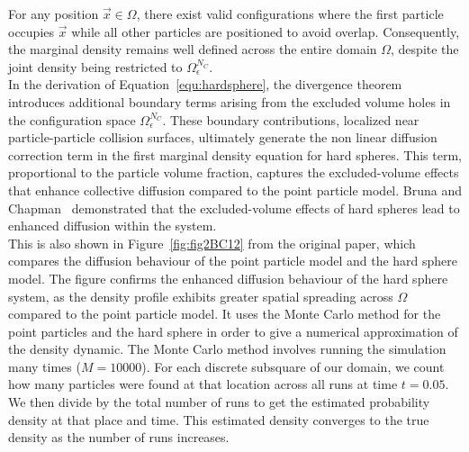 For any position $\vec{x} \in \Omega$, there exist valid configurations where the first particle occupies $\vec{x}$ while all other particles are positioned to avoid overlap. 
Consequently, the marginal density remains well defined across the entire domain $\Omega$, despite the joint density being restricted to $\Omega_{\epsilon}^{N_C}$. \\
In the derivation of Equation~\eqref{equ:hardsphere}, the divergence theorem introduces additional boundary terms arising from the excluded volume holes in the configuration space $\Omega_{\epsilon}^{N_C}$. 
These boundary contributions, localized near particle-particle collision surfaces, ultimately generate the non linear diffusion correction term in the first marginal density equation for hard spheres. 
This term, proportional to the particle volume fraction, captures the excluded-volume effects that enhance collective diffusion compared to the point particle model. 
Bruna and Chapman~\cite{Bruna2012} demonstrated that the excluded-volume effects of hard spheres lead to enhanced diffusion within the system. \\
This is also shown in Figure~\ref{fig:fig2BC12} from the original paper, which compares the diffusion behaviour of the point particle model and the hard sphere model. 
The figure confirms the enhanced diffusion behaviour of the hard sphere system, as the density profile exhibits greater spatial spreading across $\Omega$ compared to the point particle model. 
It uses the Monte Carlo method for the point particles and the hard sphere in order to give a numerical approximation of the density dynamic. 
The Monte Carlo method involves running the simulation many times ($M=10000$). 
For each discrete subsquare of our domain, we count how many particles were found at that location across all runs at time $t=0.05$. 
We then divide by the total number of runs to get the estimated probability density at that place and time. 
This estimated density converges to the true density as the number of runs increases. \\





